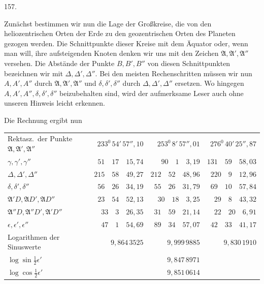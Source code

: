 \par{}\medskip
{}\hypertarget{native-213-article157}{}
\begin{center}157.\end{center}
Zunächst bestimmen wir nun die Lage der Großkreise, die von den heliozentrischen Orten der Erde zu den geozentrischen Orten des Planeten gezogen werden. Die Schnittpunkte dieser Kreise mit dem Äquator oder, wenn man will, ihre aufsteigenden Knoten denken wir uns mit den Zeichen $\mathfrak A,\mathfrak A',\mathfrak A''$ versehen. Die Abstände der Punkte $B,B',B''$ von diesen Schnittpunkten bezeichnen wir mit $\Delta,\Delta',\Delta''$. Bei den meisten Rechenschritten müssen wir nun $A,A',A''$ durch $\mathfrak A,\mathfrak A',\mathfrak A''$ und $\delta,\delta',\delta''$ durch $\Delta,\Delta',\Delta''$ ersetzen. Wo hingegen $A,A',A'',\delta,\delta',\delta''$ beizubehalten sind, wird der aufmerksame Leser auch ohne unseren Hinweis leicht erkennen.

Die Rechnung ergibt nun
\begin{center}
\begingroup\footnotesize\setlength{\tabcolsep}{3pt}\renewcommand{\arraystretch}{1.25}
\begin{tabular}{l|r|r|r}
\shortstack{Rektasz.\ der Punkte\\$\mathfrak A,\mathfrak A',\mathfrak A''$} & $233^0\,54'\,57''{,}10$ & $253^0\,8'\,57''{,}01$ & $276^0\,40'\,25''{,}87$\\
$\gamma,\gamma',\gamma''$ & $51\quad17\quad15{,}74$ & $90\quad1\quad3{,}19$ & $131\quad59\quad58{,}03$\\
$\Delta,\Delta',\Delta''$ & $215\quad58\quad49{,}27$ & $212\quad52\quad48{,}96$ & $220\quad9\quad12{,}96$\\
$\delta,\delta',\delta''$ & $56\quad26\quad34{,}19$ & $55\quad26\quad31{,}79$ & $69\quad10\quad57{,}84$\\
$\mathfrak A'D,\mathfrak AD',\mathfrak AD''$ & $23\quad54\quad52{,}13$ & $30\quad18\quad3{,}25$ & $29\quad8\quad43{,}32$\\
$\mathfrak A''D,\mathfrak A''D',\mathfrak A'D''$ & $33\quad3\quad26{,}35$ & $31\quad59\quad21{,}14$ & $22\quad20\quad6{,}91$\\
$\epsilon,\epsilon',\epsilon''$ & $47\quad1\quad54{,}69$ & $89\quad34\quad57{,}07$ & $42\quad33\quad41{,}17$\\
Logarithmen der Sinuswerte & $9{,}864\,3525$ & $9{,}999\,9885$ & $9{,}830\,1910$\\
$\log\sin\tfrac12\epsilon'$ & & $9{,}847\,8971$ &\\
$\log\cos\tfrac12\epsilon'$ & & $9{,}851\,0614$ &
\end{tabular}\endgroup
\end{center}


